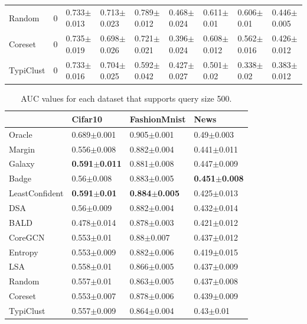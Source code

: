 \documentclass[]{article}
\begin{document}
\begin{table}[H]
{\begin{tabular}{l|llllllll}
			Random & 0 & 0.733$\pm${\small0.013} & 0.713$\pm${\small0.023} & 0.789$\pm${\small0.012} & 0.468$\pm${\small0.024} & 0.611$\pm${\small0.01} & 0.606$\pm${\small0.01} & 0.446$\pm${\small0.005} \\
			Coreset & 0 & 0.735$\pm${\small0.019} & 0.698$\pm${\small0.026} & 0.721$\pm${\small0.021} & 0.396$\pm${\small0.024} & 0.608$\pm${\small0.012} & 0.562$\pm${\small0.016} & 0.426$\pm${\small0.012} \\
			TypiClust & 0 & 0.733$\pm${\small0.016} & 0.704$\pm${\small0.025} & 0.592$\pm${\small0.042} & 0.427$\pm${\small0.027} & 0.501$\pm${\small0.02} & 0.338$\pm${\small0.02} & 0.383$\pm${\small0.012}
		\end{tabular}
	}
\end{table}
\begin{table}[H]
	\caption{AUC values for each dataset that supports query size 500.}
	\begin{tabular}{l|lll}
		& Cifar10 & FashionMnist & News \\
		\hline
Oracle & 0.689$\pm${\small0.001} & 0.905$\pm${\small0.001} & 0.49$\pm${\small0.003} \\
Margin & 0.556$\pm${\small0.008} & 0.882$\pm${\small0.004} & 0.441$\pm${\small0.011} \\
Galaxy & \textbf{0.591$\pm${\small0.011}} & 0.881$\pm${\small0.008} & 0.447$\pm${\small0.009} \\
Badge & 0.56$\pm${\small0.008} & 0.883$\pm${\small0.005} & \textbf{0.451$\pm${\small0.008}} \\
LeastConfident & \textbf{0.591$\pm${\small0.01}} & \textbf{0.884$\pm${\small0.005}} & 0.425$\pm${\small0.013} \\
DSA & 0.56$\pm${\small0.009} & 0.882$\pm${\small0.004} & 0.432$\pm${\small0.014} \\
BALD & 0.478$\pm${\small0.014} & 0.878$\pm${\small0.003} & 0.421$\pm${\small0.012} \\
CoreGCN & 0.553$\pm${\small0.01} & 0.88$\pm${\small0.007} & 0.437$\pm${\small0.012} \\
Entropy & 0.553$\pm${\small0.009} & 0.882$\pm${\small0.006} & 0.419$\pm${\small0.015} \\
LSA & 0.558$\pm${\small0.01} & 0.866$\pm${\small0.005} & 0.437$\pm${\small0.009} \\
Random & 0.557$\pm${\small0.01} & 0.863$\pm${\small0.005} & 0.437$\pm${\small0.008} \\
Coreset & 0.553$\pm${\small0.007} & 0.878$\pm${\small0.006} & 0.439$\pm${\small0.009} \\
TypiClust & 0.557$\pm${\small0.009} & 0.864$\pm${\small0.004} & 0.43$\pm${\small0.01}
	\end{tabular}
\end{table}
\end{document}
